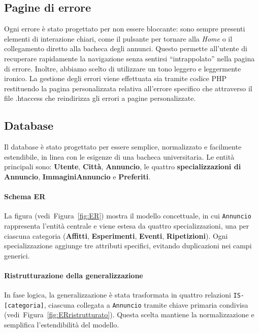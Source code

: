 \documentclass[a4paper,12pt]{article}
\begin{document}
\subsection{Pagine di errore}
Ogni errore è stato progettato per non essere bloccante: sono sempre presenti elementi di interazione chiari, come il pulsante per tornare alla \emph{Home} o il collegamento diretto alla bacheca degli annunci. Questo permette all’utente di recuperare rapidamente la navigazione senza sentirsi “intrappolato” nella pagina di errore. Inoltre, abbiamo scelto di utilizzare un tono leggero e leggermente ironico.
La gestione degli errori viene effettuata sia tramite codice PHP restituendo la pagina personalizzata relativa all'errore specifico che attraverso il
file .htaccess che reindirizza gli errori a pagine personalizzate.


\subsection{Database}

Il database è stato progettato per essere semplice, normalizzato e facilmente estendibile, 
in linea con le esigenze di una bacheca universitaria.  
Le entità principali sono: \textbf{Utente}, \textbf{Città}, \textbf{Annuncio}, le quattro 
\textbf{specializzazioni di Annuncio}, \textbf{ImmaginiAnnuncio} e \textbf{Preferiti}.

\paragraph{Schema ER}

La figura (vedi~Figura~\ref{fig:ER}) mostra il modello concettuale, in cui \texttt{Annuncio} rappresenta 
l’entità centrale e viene estesa da quattro specializzazioni, una per ciascuna categoria 
(\textbf{Affitti}, \textbf{Esperimenti}, \textbf{Eventi}, \textbf{Ripetizioni}).  
Ogni specializzazione aggiunge tre attributi specifici, evitando duplicazioni nei campi generici.

\paragraph{Ristrutturazione della generalizzazione}
In fase logica, la generalizzazione è stata trasformata in quattro relazioni \texttt{IS-[categoria]}, 
ciascuna collegata a \texttt{Annuncio} tramite chiave primaria condivisa (vedi~Figura~\ref{fig:ERristrutturato}).  
Questa scelta mantiene la normalizzazione e semplifica l’estendibilità del modello.
\end{document}
